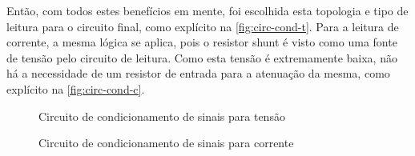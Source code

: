 Então, com todos estes benefícios em mente, foi escolhida esta topologia e tipo de leitura para o circuito final, como explícito na \autoref{fig:circ-cond-t}. Para a leitura de corrente, a mesma lógica se aplica, pois o resistor shunt é visto como uma fonte de tensão pelo circuito de leitura. Como esta tensão é extremamente baixa, não há a necessidade de um resistor de entrada para a atenuação da mesma, como explícito na \autoref{fig:circ-cond-c}.

\begin{figure}[htb!]
    \caption{Circuito de condicionamento de sinais para tensão}
    \vspace*{5mm}
    \label{fig:circ-cond-t}
    \fonte{}
\end{figure}

\begin{figure}[htb!]
    \caption{Circuito de condicionamento de sinais para corrente}
    \vspace*{5mm}
    \label{fig:circ-cond-c}
    \fonte{}
\end{figure}

